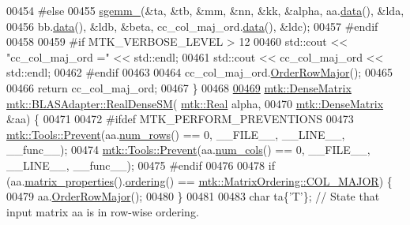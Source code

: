 \begin{DoxyCode}
00454 \textcolor{preprocessor}{  #else}
00455   \hyperlink{namespacemtk_adb7c0560326b8e57f255e58b87ec76b0}{sgemm\_}(&ta, &tb, &mm, &nn, &kk, &alpha, aa.\hyperlink{classmtk_1_1DenseMatrix_a0c33b8a9e01d157c61ddbdf807c25d84}{data}(), &lda,
00456          bb.\hyperlink{classmtk_1_1DenseMatrix_a0c33b8a9e01d157c61ddbdf807c25d84}{data}(), &ldb, &beta, cc\_col\_maj\_ord.\hyperlink{classmtk_1_1DenseMatrix_a0c33b8a9e01d157c61ddbdf807c25d84}{data}(), &ldc);
00457 \textcolor{preprocessor}{  #endif}
00458 
00459 \textcolor{preprocessor}{  #if MTK\_VERBOSE\_LEVEL > 12}
00460   std::cout << \textcolor{stringliteral}{"cc\_col\_maj\_ord ="} << std::endl;
00461   std::cout << cc\_col\_maj\_ord << std::endl;
00462 \textcolor{preprocessor}{  #endif}
00463 
00464   cc\_col\_maj\_ord.\hyperlink{classmtk_1_1DenseMatrix_ac2949efba3e8278335d45418c85433e4}{OrderRowMajor}();
00465 
00466   \textcolor{keywordflow}{return} cc\_col\_maj\_ord;
00467 \}
00468 
\hypertarget{mtk__blas__adapter_8cc_source_l00469}{}\hyperlink{classmtk_1_1BLASAdapter_a0dd80d043615a95f11b7341ce69b44d3}{00469} \hyperlink{classmtk_1_1DenseMatrix}{mtk::DenseMatrix} \hyperlink{classmtk_1_1BLASAdapter_a0dd80d043615a95f11b7341ce69b44d3}{mtk::BLASAdapter::RealDenseSM}(
      \hyperlink{group__c01-roots_gac080bbbf5cbb5502c9f00405f894857d}{mtk::Real} alpha,
00470                                                \hyperlink{classmtk_1_1DenseMatrix}{mtk::DenseMatrix} &aa) \{
00471 
00472 \textcolor{preprocessor}{  #ifdef MTK\_PERFORM\_PREVENTIONS}
00473   \hyperlink{classmtk_1_1Tools_a332324c6f25e66be9dff48c5987a3b9f}{mtk::Tools::Prevent}(aa.\hyperlink{classmtk_1_1DenseMatrix_a53f3afb3b6a8d21854458aaa9663cc74}{num\_rows}() == 0, \_\_FILE\_\_, \_\_LINE\_\_, \_\_func\_\_);
00474   \hyperlink{classmtk_1_1Tools_a332324c6f25e66be9dff48c5987a3b9f}{mtk::Tools::Prevent}(aa.\hyperlink{classmtk_1_1DenseMatrix_a41747502d468c6728a4be31501b16e0e}{num\_cols}() == 0, \_\_FILE\_\_, \_\_LINE\_\_, \_\_func\_\_);
00475 \textcolor{preprocessor}{  #endif}
00476 
00478   \textcolor{keywordflow}{if} (aa.\hyperlink{classmtk_1_1DenseMatrix_a5aa83a0643f27a4652ea97630edf7143}{matrix\_properties}().\hyperlink{classmtk_1_1Matrix_a13cd17621652cd5551ff98549bd94df7}{ordering}() == 
      \hyperlink{namespacemtk_ga622801bd9f912d0f976c3e383f5f581ca34d2765ffc490951febdcca04bc4f7cd}{mtk::MatrixOrdering::COL\_MAJOR}) \{
00479     aa.\hyperlink{classmtk_1_1DenseMatrix_ac2949efba3e8278335d45418c85433e4}{OrderRowMajor}();
00480   \}
00481 
00483   \textcolor{keywordtype}{char} ta\{\textcolor{charliteral}{'T'}\}; \textcolor{comment}{// State that input matrix aa is in row-wise ordering.}

\end{DoxyCode}
